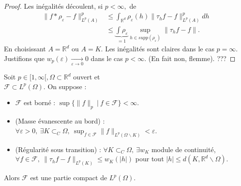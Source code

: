\begin{proof}
    Les inégalités découlent, si $p<\infty ,$ de
    \begin{align*}
        \|f*\rho_\varepsilon -f\|_{L^p(A)}^p &\le \int_{\mathbb{R} ^d}\rho_\varepsilon (h)\|\tau_hf-f\|_{L^p(A)}^pdh\\
                                             &\le \underbrace{\int\rho_\varepsilon }_{=1}\sup_{h\in supp(\rho_\varepsilon )}\|\tau_hf-f\|.
    \end{align*}
    En choisissant $A=\mathbb{R} ^d$ ou $A=K$. Les inégalités sont claires dans le cas $p=\infty .$ \\
    Justifions que $w_p(\varepsilon )\underset{\varepsilon \to 0}{\longrightarrow} 0$ dans le cas $p<\infty .$ (En fait non, flemme). ???
\end{proof}
\begin{theoreme}
    Soit $p\in [1,\infty [, \Omega\subset \mathbb{R} ^d$ ouvert et \\
    $\mathcal{F}\subset L^p(\Omega).$ On suppose :
    \begin{itemize}
        \item $\mathcal{F}$ est borné : $\sup \{\|f\|_p\ |\ f\in \mathcal{F}\} <\infty .$
        \item (Masse évanescente au bord) : \\
        $\forall \varepsilon >0,\ \exists K\subset _C\Omega,\ \sup_{f\in \mathcal{F}}\|f\|_{L^p(\Omega \backslash K)}<\varepsilon $.
        \item (Régularité sous transition) : $\forall K\subset _C\Omega,\ \exists w_K$ module de continuité, $\forall f\in \mathcal{F},\ \|\tau_hf-f\|_{L^p(K)}\le w_K(|h| )$ pour tout $|h| \le d(K,\mathbb{R} ^d \backslash \Omega).$
    \end{itemize}
    Alors $\mathcal{F}$ est une partie compact de $L^p(\Omega).$
\end{theoreme}
